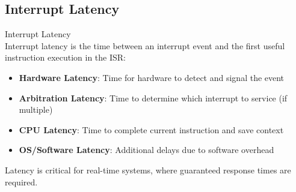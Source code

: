 \subsection{Interrupt Latency}

\begin{definition}{Interrupt Latency}\\
Interrupt latency is the time between an interrupt event and the first useful instruction execution in the ISR:
\begin{itemize}
    \item \textbf{Hardware Latency}: Time for hardware to detect and signal the event
    \item \textbf{Arbitration Latency}: Time to determine which interrupt to service (if multiple)
    \item \textbf{CPU Latency}: Time to complete current instruction and save context
    \item \textbf{OS/Software Latency}: Additional delays due to software overhead
\end{itemize}
Latency is critical for real-time systems, where guaranteed response times are required.
\end{definition}

